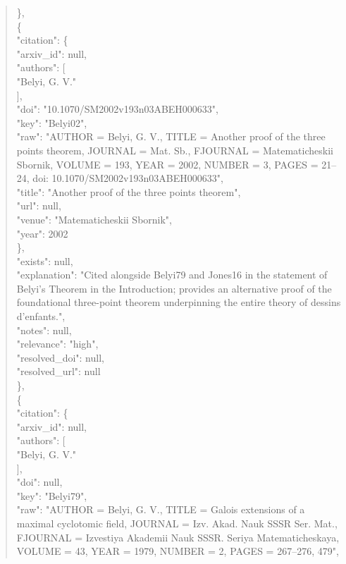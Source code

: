 \documentclass[11pt]{article}
\begin{document}
\begin{quote}
    \},\\
    \{\\
      "citation": \{\\
        "arxiv\_id": null,\\
        "authors": [\\
          "Belyi, G. V."\\
        ],\\
        "doi": "10.1070/SM2002v193n03ABEH000633",\\
        "key": "Belyi02",\\
        "raw": "AUTHOR = Belyi, G. V., TITLE = Another proof of the three points theorem, JOURNAL = Mat. Sb., FJOURNAL = Matematicheskii Sbornik, VOLUME = 193, YEAR = 2002, NUMBER = 3, PAGES = 21--24, doi: 10.1070/SM2002v193n03ABEH000633",\\
        "title": "Another proof of the three points theorem",\\
        "url": null,\\
        "venue": "Matematicheskii Sbornik",\\
        "year": 2002\\
      \},\\
      "exists": null,\\
      "explanation": "Cited alongside Belyi79 and Jones16 in the statement of Belyi's Theorem in the Introduction; provides an alternative proof of the foundational three-point theorem underpinning the entire theory of dessins d'enfants.",\\
      "notes": null,\\
      "relevance": "high",\\
      "resolved\_doi": null,\\
      "resolved\_url": null\\
    \},\\
    \{\\
      "citation": \{\\
        "arxiv\_id": null,\\
        "authors": [\\
          "Belyi, G. V."\\
        ],\\
        "doi": null,\\
        "key": "Belyi79",\\
        "raw": "AUTHOR = Belyi, G. V., TITLE = Galois extensions of a maximal cyclotomic field, JOURNAL = Izv. Akad. Nauk SSSR Ser. Mat., FJOURNAL = Izvestiya Akademii Nauk SSSR. Seriya Matematicheskaya, VOLUME = 43, YEAR = 1979, NUMBER = 2, PAGES = 267--276, 479",\\

\end{quote}
\end{document}

